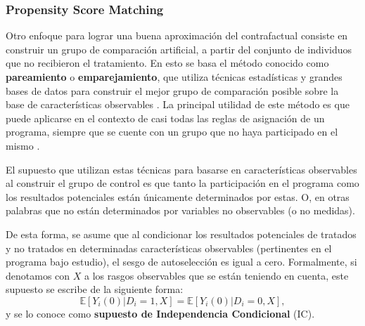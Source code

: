 \documentclass[../../main.tex]{subfiles}
\begin{document}


\subsubsection{Propensity Score Matching}

Otro enfoque para lograr una buena aproximación del contrafactual consiste en construir un
grupo de comparación artificial, a partir del conjunto de individuos que no recibieron el
tratamiento. En esto se basa el método conocido como \textbf{pareamiento} o
\textbf{emparejamiento}, que utiliza técnicas estadísticas y grandes bases de datos para
construir el mejor grupo de comparación posible sobre la base de características
observables \cite{gertler-2016}. La principal utilidad de este método es que puede
aplicarse en el contexto de casi todas las reglas de asignación de un programa, siempre
que se cuente con un grupo que no haya participado en el mismo \cite{gertler-2016}.

El supuesto que utilizan estas técnicas para basarse en características observables al
construir el grupo de control es que tanto la participación en el programa como los
resultados potenciales están únicamente determinados por estas. O, en otras palabras que
no están determinados por variables no observables (o no medidas).

De esta forma, se asume que al condicionar los resultados potenciales de tratados y no
tratados en determinadas características observables (pertinentes en el programa bajo
estudio), el sesgo de autoselección es igual a cero. Formalmente, si denotamos con \(X\) a
los rasgos observables que se están teniendo en cuenta, este supuesto se escribe de la
siguiente forma:
\begin{equation}
    \mathbb{E}\left[Y_i(0)|D_i=1, X\right] = \mathbb{E}\left[Y_i(0)|D_i=0, X\right],
\end{equation}
y se lo conoce como \textbf{supuesto de Independencia Condicional} (IC).
\end{document}
